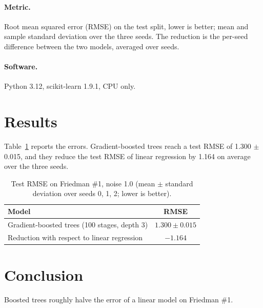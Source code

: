 \documentclass[11pt]{article}
\begin{document}
\paragraph{Metric.} Root mean squared error (RMSE) on the test split, lower is better; mean and
sample standard deviation over the three seeds. The reduction is the per-seed difference between
the two models, averaged over seeds.
\paragraph{Software.} Python 3.12, scikit-learn 1.9.1, CPU only.

\section{Results}
Table~\ref{tab:friedman} reports the errors. Gradient-boosted trees reach a test RMSE of
1.300 $\pm$ 0.015, and they reduce the test RMSE of linear regression by 1.164 on average over
the three seeds.

\begin{table}[t]
\centering
\caption{Test RMSE on Friedman \#1, noise 1.0 (mean $\pm$ standard deviation over seeds 0, 1, 2;
lower is better).}
\label{tab:friedman}
\begin{tabular}{lc}
\toprule
Model & RMSE \\
\midrule
Gradient-boosted trees (100 stages, depth 3) & $1.300 \pm 0.015$ \\
\midrule
Reduction with respect to linear regression & $-1.164$ \\
\bottomrule
\end{tabular}
\end{table}

\section{Conclusion}
Boosted trees roughly halve the error of a linear model on Friedman \#1.
\end{document}
